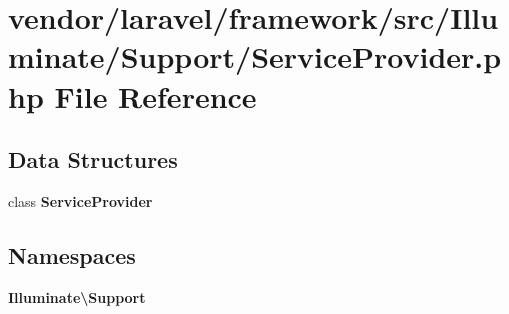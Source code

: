 \section{vendor/laravel/framework/src/\+Illuminate/\+Support/\+Service\+Provider.php File Reference}
\label{_service_provider_8php}
\subsection*{Data Structures}
\begin{DoxyCompactItemize}
\item 
class {\bf Service\+Provider}
\end{DoxyCompactItemize}
\subsection*{Namespaces}
\begin{DoxyCompactItemize}
\item 
 {\bf Illuminate\textbackslash{}\+Support}
\end{DoxyCompactItemize}

